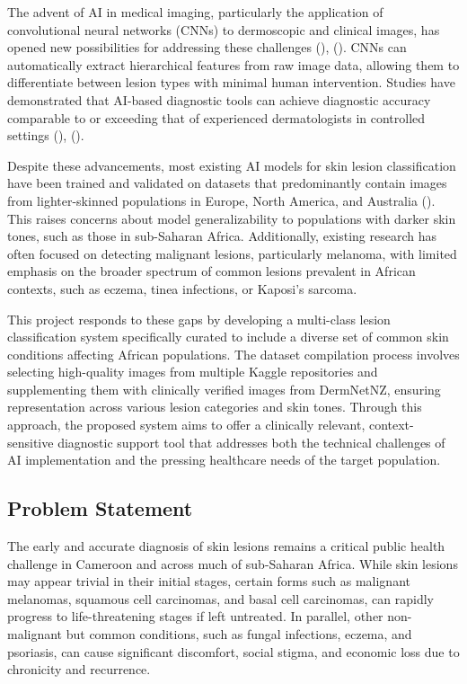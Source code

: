 \documentclass[
  12pt,
  oneside]{article}
\begin{document}
The advent of AI in medical imaging, particularly the application of
convolutional neural networks (CNNs) to dermoscopic and clinical images,
has opened new possibilities for addressing these challenges
(),
(). CNNs can
automatically extract hierarchical features from raw image data,
allowing them to differentiate between lesion types with minimal human
intervention. Studies have demonstrated that AI-based diagnostic tools
can achieve diagnostic accuracy comparable to or exceeding that of
experienced dermatologists in controlled settings
(),
().

Despite these advancements, most existing AI models for skin lesion
classification have been trained and validated on datasets that
predominantly contain images from lighter-skinned populations in Europe,
North America, and Australia (). This raises concerns about model generalizability to
populations with darker skin tones, such as those in sub-Saharan Africa.
Additionally, existing research has often focused on detecting malignant
lesions, particularly melanoma, with limited emphasis on the broader
spectrum of common lesions prevalent in African contexts, such as
eczema, tinea infections, or Kaposi's sarcoma.

This project responds to these gaps by developing a multi-class lesion
classification system specifically curated to include a diverse set of
common skin conditions affecting African populations. The dataset
compilation process involves selecting high-quality images from multiple
Kaggle repositories and supplementing them with clinically verified
images from DermNetNZ, ensuring representation across various lesion
categories and skin tones. Through this approach, the proposed system
aims to offer a clinically relevant, context-sensitive diagnostic
support tool that addresses both the technical challenges of AI
implementation and the pressing healthcare needs of the target
population.

\subsection{Problem Statement}\label{problem-statement}

The early and accurate diagnosis of skin lesions remains a critical
public health challenge in Cameroon and across much of sub-Saharan
Africa. While skin lesions may appear trivial in their initial stages,
certain forms such as malignant melanomas, squamous cell carcinomas, and
basal cell carcinomas, can rapidly progress to life-threatening stages
if left untreated. In parallel, other non-malignant but common
conditions, such as fungal infections, eczema, and psoriasis, can cause
significant discomfort, social stigma, and economic loss due to
chronicity and recurrence.
\end{document}

